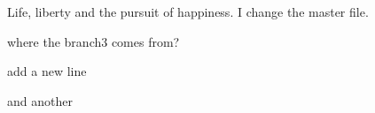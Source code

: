 \documentclass{article}
\begin{document}
Life, liberty and the pursuit of happiness.
I change the master file.

where the branch3 comes from?

add a new line

and another
\end{document}
